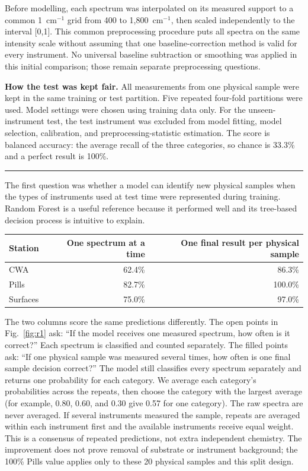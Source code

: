 \documentclass[10pt]{article}
\newcommand{\sectiontitle}[1]{\vspace{2pt}{\large\bfseries #1}\par\vspace{1pt}\hrule\vspace{3pt}}
\begin{document}
Before modelling, each spectrum was interpolated on its measured support to a common 1~cm$^{-1}$ grid from 400 to 1,800~cm$^{-1}$, then scaled independently to the interval [0,1]. This common preprocessing procedure puts all spectra on the same intensity scale without assuming that one baseline-correction method is valid for every instrument. No universal baseline subtraction or smoothing was applied in this initial comparison; those remain separate preprocessing questions.

\textbf{How the test was kept fair.} All measurements from one physical sample were kept in the same training or test partition. Five repeated four-fold partitions were used. Model settings were chosen using training data only. For the unseen-instrument test, the test instrument was excluded from model fitting, model selection, calibration, and preprocessing-statistic estimation. The score is balanced accuracy: the average recall of the three categories, so chance is 33.3\% and a perfect result is 100\%.

\sectiontitle{2. New samples measured with familiar instruments}
The first question was whether a model can identify new physical samples when the types of instruments used at test time were represented during training. Random Forest is a useful reference because it performed well and its tree-based decision process is intuitive to explain.

\begin{center}
\small
\begin{tabular}{lrr}
\toprule
Station & One spectrum at a time & One final result per physical sample\\
\midrule
CWA & 62.4\% & 86.3\%\\
Pills & 82.7\% & 100.0\%\\
Surfaces & 75.0\% & 97.0\%\\
\bottomrule
\end{tabular}
\end{center}

The two columns score the same predictions differently. The open points in Fig.~\ref{fig:r1} ask: ``If the model receives one measured spectrum, how often is it correct?'' Each spectrum is classified and counted separately. The filled points ask: ``If one physical sample was measured several times, how often is one final sample decision correct?'' The model still classifies every spectrum separately and returns one probability for each category. We average each category's probabilities across the repeats, then choose the category with the largest average (for example, 0.80, 0.60, and 0.30 give 0.57 for one category). The raw spectra are never averaged. If several instruments measured the sample, repeats are averaged within each instrument first and the available instruments receive equal weight. This is a consensus of repeated predictions, not extra independent chemistry. The improvement does not prove removal of substrate or instrument background; the 100\% Pills value applies only to these 20 physical samples and this split design.
\end{document}
